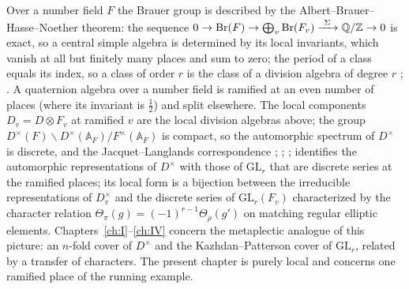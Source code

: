 Over a number field $F$ the Brauer group is described by the
Albert--Brauer--Hasse--Noether theorem: the sequence
$0\to\mathrm{Br}(F)\to\bigoplus_v\mathrm{Br}(F_v)\xrightarrow{\ \Sigma\ }\Q/\Z\to0$
is exact, so a central simple algebra is determined by its local
invariants, which vanish at all but finitely many places and sum to
zero; the period of a class equals its index, so a class of order $r$ is
the class of a division algebra of degree $r$ \cite[\S32]{Rei75}; \cite[Ch.~XIII]{Wei73}.
A quaternion algebra over a number field is ramified at an even number
of places (where its invariant is $\tfrac12$) and split elsewhere.  The
local components $D_v=D\otimes F_v$ at ramified $v$ are the local
division algebras above; the group $D^\times(F)\backslash D^\times(\mathbb A_F)/F^\times(\mathbb A_F)$
is compact, so the automorphic spectrum of $D^\times$ is discrete, and
the Jacquet--Langlands correspondence \cite[Ch.~III]{JL70}; \cite{DKV84}; \cite{Rog83}; \cite{Bad08}
identifies the automorphic representations of $D^\times$ with those of
$\mathrm{GL}_r$ that are discrete series at the ramified places; its
local form is a bijection between the irreducible representations of
$D_v^\times$ and the discrete series of $\mathrm{GL}_r(F_v)$ characterized
by the character relation $\Theta_\pi(g)=(-1)^{r-1}\Theta_\rho(g')$ on
matching regular elliptic elements.  Chapters~\ref{ch:I}--\ref{ch:IV} concern
the metaplectic analogue of this picture: an $n$-fold cover of
$D^\times$ and the Kazhdan--Patterson cover of $\mathrm{GL}_r$, related
by a transfer of characters.  The present chapter is purely local and
concerns one ramified place of the running example.

